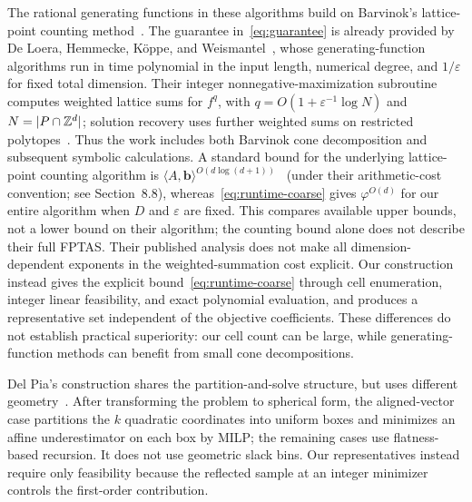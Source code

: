 \documentclass[11pt]{article}
\theoremstyle{definition}\newtheorem{definition}{Definition}[section]
\theoremstyle{remark}\newtheorem{remark}[theorem]{Remark}
\newcommand{\eps}{\varepsilon}
\begin{document}
The rational generating functions in these algorithms build on Barvinok's lattice-point counting method~\cite{Barvinok}. The guarantee in~\eqref{eq:guarantee} is already provided by De Loera, Hemmecke, K\"oppe, and Weismantel~\cite{DHKW06,DHKW08}, whose generating-function algorithms run in time polynomial in the input length, numerical degree, and $1/\eps$ for fixed total dimension. Their integer nonnegative-maximization subroutine computes weighted lattice sums for $f^q$, with $q=O(1+\eps^{-1}\log N)$ and $N=|P\cap\mathbb Z^d|$; solution recovery uses further weighted sums on restricted polytopes~\cite[Section~3]{DHKW06}. Thus the work includes both Barvinok cone decomposition and subsequent symbolic calculations. A standard bound for the underlying lattice-point counting algorithm is $\langle A,\mathbf b\rangle^{O(d\log(d+1))}$~\cite[Theorem~2.5]{PakPanova} (under their arithmetic-cost convention; see Section~8.8), whereas~\eqref{eq:runtime-coarse} gives $\varphi^{O(d)}$ for our entire algorithm when $D$ and $\eps$ are fixed. This compares available upper bounds, not a lower bound on their algorithm; the counting bound alone does not describe their full FPTAS. Their published analysis does not make all dimension-dependent exponents in the weighted-summation cost explicit. Our construction instead gives the explicit bound~\eqref{eq:runtime-coarse} through cell enumeration, integer linear feasibility, and exact polynomial evaluation, and produces a representative set independent of the objective coefficients. These differences do not establish practical superiority: our cell count can be large, while generating-function methods can benefit from small cone decompositions.

Del Pia's construction shares the partition-and-solve structure, but uses different geometry~\cite[Sections~3--6]{DelPia}. After transforming the problem to spherical form, the aligned-vector case partitions the $k$ quadratic coordinates into uniform boxes and minimizes an affine underestimator on each box by MILP; the remaining cases use flatness-based recursion. It does not use geometric slack bins. Our representatives instead require only feasibility because the reflected sample at an integer minimizer controls the first-order contribution.
\end{document}
